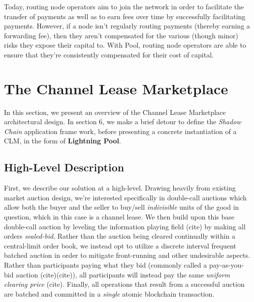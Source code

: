 \documentclass[10pt,a4paper]{article}
\theoremstyle{definition}
\begin{document}
Today, routing node operators aim to join the network in order to facilitate the
transfer of payments as well as to earn fees over time by successfully facilitating
payments. However, if a node isn't regularly routing payments (thereby earning
a forwarding fee), then they aren't compensated for the various (though minor)
risks they expose their capital to. With Pool, routing node operators are able
to ensure that they're consistently compensated for their cost of capital. 

\section{The Channel Lease Marketplace} %

In this section, we present an overview of the Channel Lease Marketplace
architectural design. In section 6, we make a brief detour to define the
\emph{Shadow Chain} application frame work, before presenting a concrete
instantiation of a CLM, in the form of \textbf{Lightning Pool}. 

\subsection{High-Level Description}

First, we describe our solution at a high-level. Drawing heavily from existing
market auction design, we're interested specifically in double-call auctions
which allow both the buyer and the seller to buy/sell \emph{indivisible} units
of the good in question, which in this case is a channel lease. We then build
upon this base double-call auction by leveling the information playing field
(cite) by making all orders \emph{sealed-bid}. Rather than the auction being
cleared continually within a central-limit order book, we instead opt to
utilize a discrete interval frequent batched auction in order to mitigate
front-running and other undesirable aspects. Rather than participants paying
what they bid (commonly called a pay-as-you-bid auction (cite)(cite)), all
participants will instead pay the same \emph{uniform clearing price} (cite).
Finally, all operations that result from a successful auction are batched and
committed in a \emph{single} atomic blockchain transaction.

\clearpage
\end{document}
